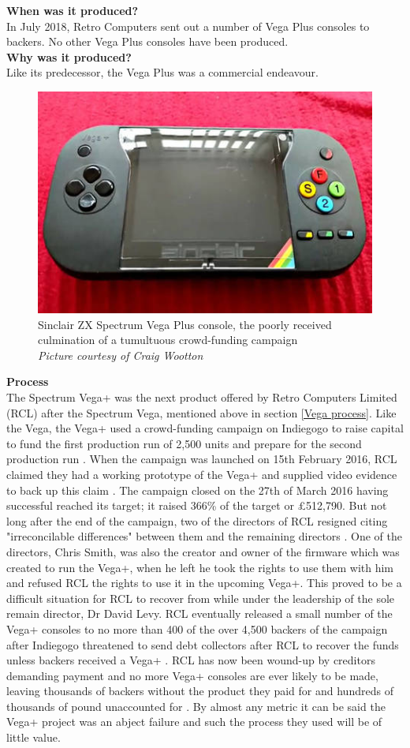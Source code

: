 \textbf{When was it produced?}\\
In July 2018, Retro Computers sent out a number of Vega Plus consoles to backers. No other Vega Plus consoles have been produced.\\

\textbf{Why was it produced?}\\
Like its predecessor, the Vega Plus was a commercial endeavour. \\

\begin{figure} \begin{center}
\includegraphics[width=.3\linewidth]{pics/Spectrum_vega_plus} 
\end{center} 
\caption{Sinclair ZX Spectrum Vega Plus console, the poorly received culmination of a tumultuous crowd-funding campaign  \\ \textit{\small{Picture courtesy of Craig Wootton}}}
\label{Spectrum_Vega_Plus}
\end{figure} 

\textbf{Process}\\
The Spectrum Vega+ was the next product offered by Retro Computers Limited (RCL) after the Spectrum Vega, mentioned above in section \ref{Vega process}. Like the Vega, the Vega+ used a crowd-funding campaign on Indiegogo to raise capital to fund the first production run of 2,500 units and prepare for the second production run 
\cite{RN143}. When the campaign was launched on 15th February 2016, RCL claimed they had a working prototype of the Vega+ and supplied video evidence to back up this claim 
\cite{RN145}\cite{RN143}. The campaign closed on the 27th of March 2016 having successful reached its target; it raised 366\% of the target or \pounds 512,790. 
But not long after the end of the campaign, two of the directors of RCL resigned citing "irreconcilable differences" between them and the remaining directors
\cite{RN146}. One of the directors, Chris Smith, was also the creator and owner of the firmware which was created to run the Vega+, when he left he took the rights to use them with him and refused RCL the rights to use it in the upcoming Vega+. This proved to be a difficult situation for RCL to recover from while under the leadership of the sole remain director, Dr David Levy. RCL eventually released a small number of the Vega+ consoles to no more than 400 of the over 4,500 backers of the campaign after Indiegogo threatened to send debt collectors after RCL to recover the funds unless backers received a Vega+ 
\cite{RN147}. RCL has now been wound-up by creditors demanding payment and no more Vega+ consoles are ever likely to be made, leaving thousands of backers without the product they paid for and hundreds of thousands of pound unaccounted for 
\cite{RN120}\cite{RN148}. By almost any metric it can be said the Vega+ project was an abject failure and such the process they used will be of little value. \\

